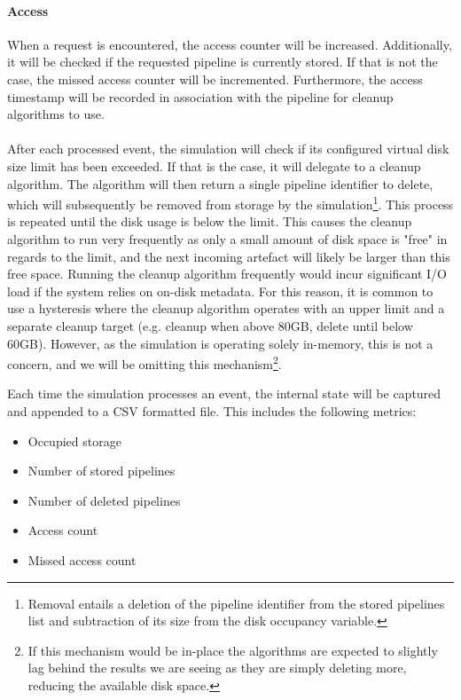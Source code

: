     \paragraph{Access} When a request is encountered, the access counter will be increased. Additionally, it will be checked if the requested pipeline is currently stored. If that is not the case, the missed access counter will be incremented. Furthermore, the access timestamp will be recorded in association with the pipeline for cleanup algorithms to use.
    \\
    \\
    After each processed event, the simulation will check if its configured virtual disk size limit has been exceeded. If that is the case, it will delegate to a cleanup algorithm. The algorithm will then return a single pipeline identifier to delete, which will subsequently be removed from storage by the simulation\footnote{Removal entails a deletion of the pipeline identifier from the stored pipelines list and subtraction of its size from the disk occupancy variable.}. This process is repeated until the disk usage is below the limit. This causes the cleanup algorithm to run very frequently as only a small amount of disk space is "free" in regards to the limit, and the next incoming artefact will likely be larger than this free space. Running the cleanup algorithm frequently would incur significant I/O load if the system relies on on-disk metadata. For this reason, it is common to use a hysteresis where the cleanup algorithm operates with an upper limit and a separate cleanup target (e.g. cleanup when above 80GB, delete until below 60GB). However, as the simulation is operating solely in-memory, this is not a concern, and we will be omitting this mechanism\footnote{If this mechanism would be in-place the algorithms are expected to slightly lag behind the results we are seeing as they are simply deleting more, reducing the available disk space.}.
    
    Each time the simulation processes an event, the internal state will be captured and appended to a CSV formatted file. This includes the following metrics:
    
    \begin{itemize}
        \item Occupied storage
        \item Number of stored pipelines
        \item Number of deleted pipelines
        \item Access count
        \item Missed access count
    \end{itemize}
    
